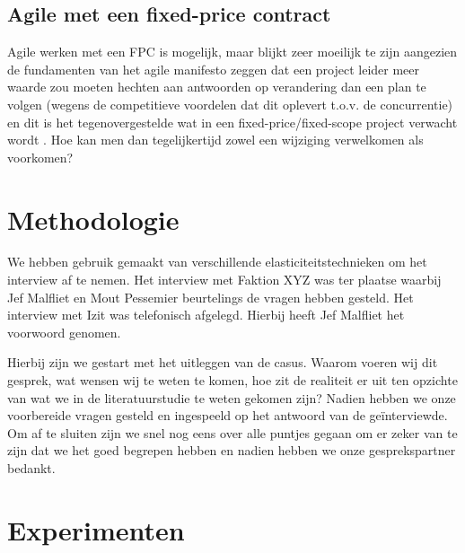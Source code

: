 \documentclass{hogent-article}
\begin{document}
    \subsection{Agile met een fixed-price contract}
    Agile werken met een FPC is mogelijk, maar blijkt zeer moeilijk te zijn aangezien de fundamenten van het agile manifesto zeggen dat een project leider meer waarde zou moeten hechten aan antwoorden op verandering dan een plan te volgen (wegens de competitieve voordelen dat dit oplevert t.o.v. de concurrentie) en dit is het tegenovergestelde wat in een fixed-price/fixed-scope project verwacht wordt \autocite{PMI2011}. Hoe kan men dan tegelijkertijd zowel een wijziging verwelkomen als voorkomen?
	
	\section{Methodologie}
	We hebben gebruik gemaakt van verschillende elasticiteitstechnieken om het interview af te nemen. Het interview met Faktion XYZ was ter plaatse waarbij Jef Malfliet en Mout Pessemier beurtelings de vragen hebben gesteld. Het interview met Izit was telefonisch afgelegd. Hierbij heeft Jef Malfliet het voorwoord genomen.
	
	Hierbij zijn we gestart met het uitleggen van de casus. Waarom voeren wij dit gesprek, wat wensen wij te weten te komen, hoe zit de realiteit er uit ten opzichte van wat we in de literatuurstudie te weten gekomen zijn? Nadien hebben we onze voorbereide vragen gesteld en ingespeeld op het antwoord van de geïnterviewde. Om af te sluiten zijn we snel nog eens over alle puntjes gegaan om er zeker van te zijn dat we het goed begrepen hebben en nadien hebben we onze gesprekspartner bedankt.
	
	\section{Experimenten}
\end{document}
